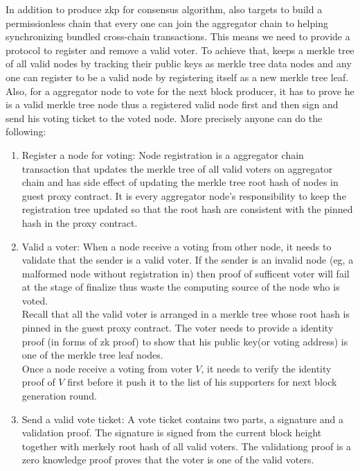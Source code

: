 \documentclass[acmtog, natbib=false]{acmart}
\begin{document}
In addition to produce zkp for consensus algorithm, \dprotocol also targets to build a permissionless chain that every one can join the aggregator chain to helping synchronizing bundled cross-chain transactions. This means we need to provide a protocol to register and remove a valid voter. To achieve that, \dprotocol keeps a merkle tree of all valid nodes by tracking their public keys as merkle tree data nodes and any one can register to be a valid node by registering itself as a new merkle tree leaf. Also, for a aggregator node to vote for the next block producer, it has to prove he is a valid merkle tree node thus a registered valid node first and then sign and send his voting ticket to the voted node. More precisely anyone can do the following:
\begin{enumerate}[leftmargin=*]
\item Register a node for voting:
    Node registration is a aggregator chain transaction that updates the merkle tree of all valid voters on aggregator chain and has side effect of updating the merkle tree root hash of nodes in guest proxy contract. It is every aggregator node's responsibility to keep the registration tree updated so that the root hash are consistent with the pinned hash in the proxy contract. \\

\item Valid a voter:
    When a node receive a voting from other node, it needs to validate that the sender is a valid voter. If the sender is an invalid node (eg, a malformed node without registration in) then proof of sufficent voter will fail at the stage of finalize thus waste the computing source of the node who is voted.\\

    Recall that all the valid voter is arranged in a merkle tree whose root hash is pinned in the guest proxy contract. The voter needs to provide a identity proof (in forms of zk proof) to show that his public key(or voting address) is one of the merkle tree leaf nodes.\\

    Once a node receive a voting from voter $V$, it needs to verify the identity proof of $V$ first before it push it to the list of his supporters for next block generation round.\\

\item Send a valid vote ticket:
    A vote ticket contains two parts, a signature and a validation proof. The signature is signed from the current block height together with merkely root hash of all valid voters. The validationg proof is a zero knowledge proof proves that the voter is one of the valid voters. 
\end{enumerate}
\end{document}
